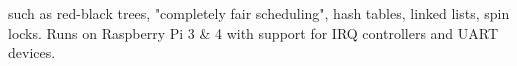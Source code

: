 \documentclass{article}
\newenvironment{colorheading}{\fontfamily{phv}\selectfont\bfseries\normalsize\color{darkcyan}}{\par}
\newenvironment{genericbody}{\fontfamily{phv}\selectfont\footnotesize\raggedright}{\par}
\newenvironment{metadata}{\fontfamily{phv}\selectfont\itshape\footnotesize\color{darkgray}}{\par}
\newenvironment{experience}[2]%
{%
  \begin{minipage}{0.71\linewidth}\raggedright#1\end{minipage}%
  \hfill%
  \begin{minipage}{0.28\linewidth}\raggedleft#2\end{minipage}%
}%
{\par}
\begin{document}
\begin{minipage}[t]{0.67\linewidth}
\begin{genericbody}
      such as red-black trees, "completely fair scheduling", hash tables, linked lists, spin locks. Runs on Raspberry Pi 3 \& 4
      with support for IRQ controllers and UART devices.
    \end{genericbody}
  \end{minipage}
\end{document}
